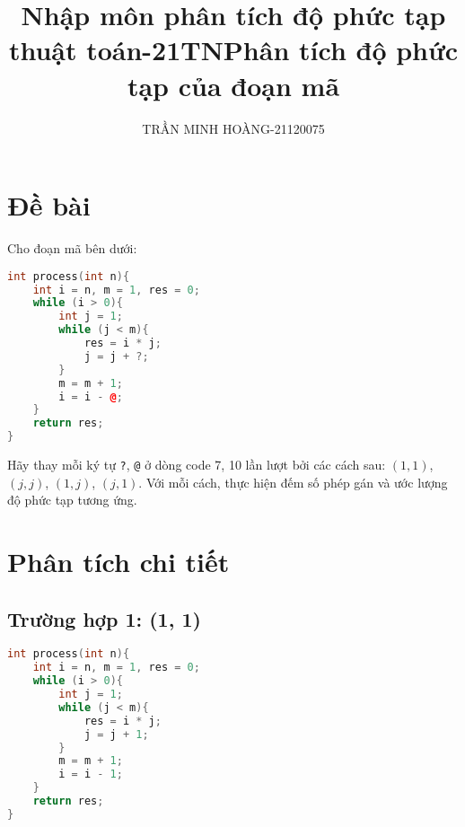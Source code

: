 \documentclass[12pt,a4paper]{article}
\title{\LARGE{\textbf{Nhập môn phân tích độ phức tạp thuật toán-21TN}}}
\author{TRẦN MINH HOÀNG-21120075}
\date{} %
\begin{document}
\maketitle
\title{Phân tích độ phức tạp của đoạn mã}
\author{}
\date{}
\maketitle

\section*{Đề bài}

Cho đoạn mã bên dưới:

\begin{lstlisting}[language=C++]
int process(int n){
    int i = n, m = 1, res = 0;
    while (i > 0){
        int j = 1;
        while (j < m){
            res = i * j;
            j = j + ?;
        }
        m = m + 1;
        i = i - @;
    }
    return res;
}
\end{lstlisting}

Hãy thay mỗi ký tự \texttt{?}, \texttt{@} ở dòng code 7, 10 lần lượt bởi các cách sau: $(1,1)$, $(j,j)$, $(1,j)$, $(j,1)$. Với mỗi cách, thực hiện đếm số phép gán và ước lượng độ phức tạp tương ứng.

\section*{Phân tích chi tiết}

\subsection*{Trường hợp 1: (1, 1)}
\begin{lstlisting}[language=C++]
int process(int n){
    int i = n, m = 1, res = 0;
    while (i > 0){
        int j = 1;
        while (j < m){
            res = i * j;
            j = j + 1;
        }
        m = m + 1;
        i = i - 1;
    }
    return res;
}
\end{lstlisting}
\end{document}
